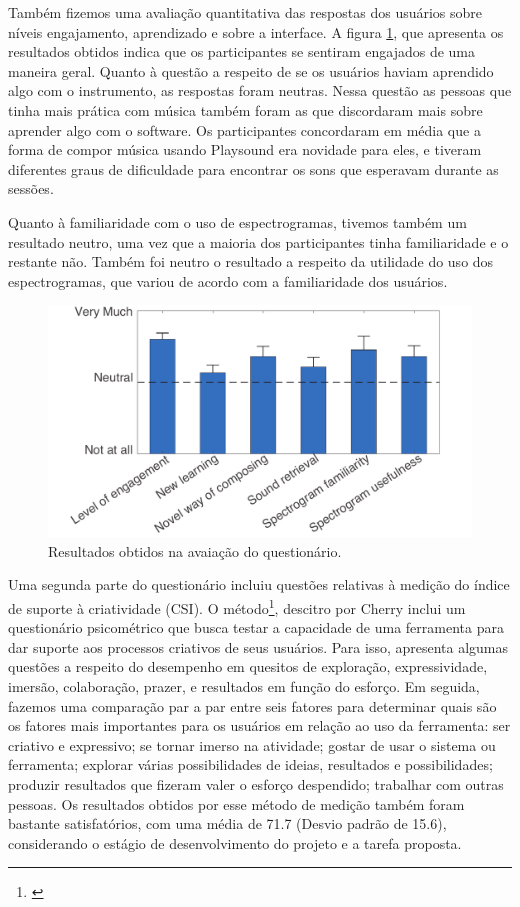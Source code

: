 Também fizemos uma avaliação quantitativa das respostas dos usuários sobre níveis engajamento, aprendizado e sobre a interface. A figura \ref{fig:questionnaire}, que apresenta os resultados obtidos indica que os participantes se sentiram engajados de uma maneira geral. Quanto à questão a respeito de se os usuários haviam aprendido algo com o instrumento, as respostas foram neutras. Nessa questão as pessoas que tinha mais prática com música também foram as que discordaram mais sobre aprender algo com o software. Os participantes concordaram em média que a forma de compor música usando Playsound era novidade para eles, e tiveram diferentes graus de dificuldade para encontrar os sons que esperavam durante as sessões. 

Quanto à familiaridade com o uso de espectrogramas, tivemos também um resultado neutro, uma vez que a maioria dos participantes tinha familiaridade e o restante não. Também foi neutro o resultado a respeito da utilidade do uso dos espectrogramas, que variou de acordo com a familiaridade dos usuários.


\begin{figure}

\includegraphics[width=1\textwidth]{pictures/cap4/questionnaire_lower}
\caption{\label{amas}Resultados obtidos na avaiação do questionário.}
\label{fig:questionnaire}
\end{figure}

Uma segunda parte do questionário incluiu questões relativas à medição do índice de suporte à criatividade (CSI). O método\footnote{\cite{Cherry2014}}, descitro por Cherry inclui um questionário psicométrico que busca testar a capacidade de uma ferramenta para dar suporte aos processos criativos de seus usuários. Para isso, apresenta algumas questões a respeito do desempenho em quesitos de exploração, expressividade, imersão, colaboração, prazer, e resultados em função do esforço. Em seguida, fazemos uma comparação par a par entre seis fatores para determinar quais são os fatores mais importantes para os usuários em relação ao uso da ferramenta: ser criativo e expressivo; se tornar imerso na atividade; gostar de usar o sistema ou ferramenta; explorar várias possibilidades de ideias, resultados e possibilidades; produzir resultados que fizeram valer o esforço despendido; trabalhar com outras pessoas. Os resultados obtidos por esse método de medição também foram bastante satisfatórios, com uma média de 71.7 (Desvio padrão de 15.6), considerando o estágio de desenvolvimento do projeto e a tarefa proposta.


